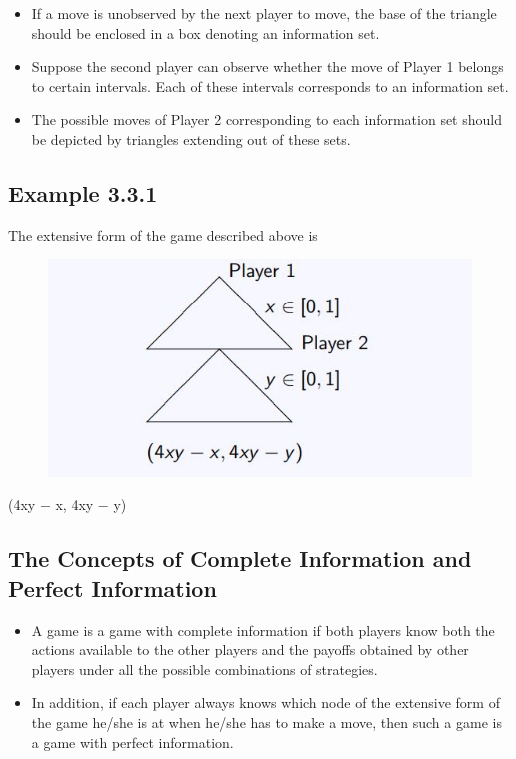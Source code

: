 \documentclass[]{report}
\begin{document}
\begin{itemize}
	\item If a move is unobserved by the next player to move, the base of the
	triangle should be enclosed in a box denoting an information set.
	\item Suppose the second player can observe whether the move of Player
	1 belongs to certain intervals. Each of these intervals corresponds
	to an information set.
	\item  The possible moves of Player 2 corresponding to each information
	set should be depicted by triangles extending out of these sets. 
\end{itemize}

\subsection{Example 3.3.1}
The extensive form of the game described above is

\begin{figure}
\centering
\includegraphics[width=0.55\linewidth]{images/DR5-Slide31}
\caption{}
\label{fig:DR5-Slide31}
\end{figure}

(4xy − x, 4xy − y)
\subsection{The Concepts of Complete Information and Perfect
	Information}
\begin{itemize}
	\item A game is a game with complete information if both players
	know both the actions available to the other players and the
	payoffs obtained by other players under all the possible
	combinations of strategies.
\item 	In addition, if each player always knows which node of the
	extensive form of the game he/she is at when he/she has to make
	a move, then such a game is a game with perfect information.
\end{itemize}
\end{document}
